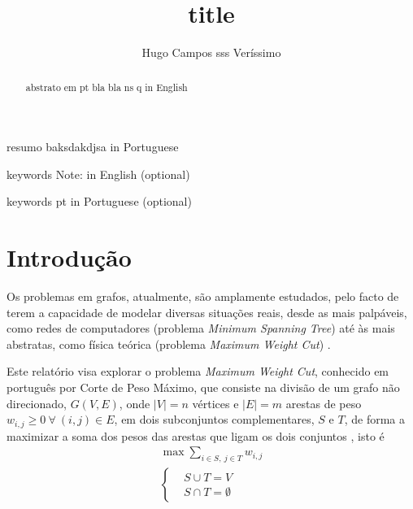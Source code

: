 \documentclass[mirror]{revdetua}
\begin{document}

\title{title}
\author{Hugo Campos sss Veríssimo}
\maketitle

\begin{abstract}
abstrato em pt bla bla ns q in English
\end{abstract}

\begin{resumo}
resumo baksdakdjsa in Portuguese
\end{resumo}

\begin{keywords}
keywords Note: in English (optional)
\end{keywords}

\begin{palavraschave}
keywords pt in Portuguese (optional)
\end{palavraschave}

\section{Introdução}

Os problemas em grafos, atualmente, são amplamente estudados, pelo facto de terem a capacidade de modelar diversas situações reais, desde as mais palpáveis, como redes de computadores (problema \textit{Minimum Spanning Tree}) até às mais abstratas, como física teórica (problema \textit{Maximum Weight Cut}) \cite{WP24}.

Este relatório visa explorar o problema \textit{Maximum Weight Cut}, conhecido em português por Corte de Peso Máximo, que consiste na divisão de um grafo não direcionado, $G(V, E)$, onde $|V| = n$ vértices e $|E| = m$ arestas de peso $w_{i,j} \geq 0\ \forall\ (i,j) \in E$, em dois subconjuntos complementares, $S$ e $T$, de forma a maximizar a soma dos pesos das arestas que ligam os dois conjuntos \cite{SC03}, isto é
\begin{equation*}
    \begin{split}
        \max \sum_{i \in S,\ j \in T} w_{i,j} \\ 
        \left\{\begin{split}
            &S \cup T = V \\
            &S \cap T = \emptyset
        \end{split}\right.
    \end{split}
\end{equation*}
\end{document}
